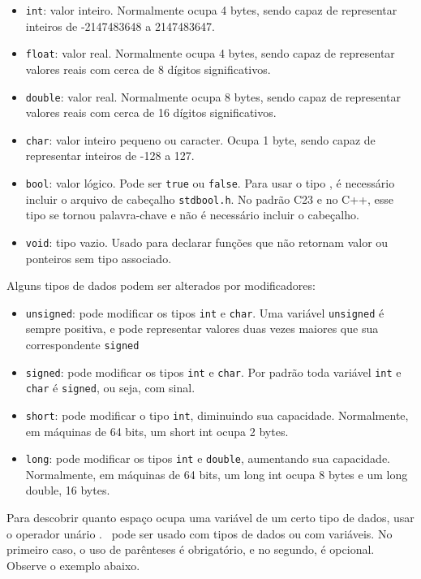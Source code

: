 \begin{itemize}
\item {\tt int}: valor inteiro. Normalmente ocupa 4 bytes, sendo capaz de representar inteiros de -2147483648 a 2147483647.
\item {\tt float}: valor real. Normalmente ocupa 4 bytes, sendo capaz de representar valores reais com cerca de 8 dígitos significativos.
\item {\tt double}: valor real. Normalmente ocupa 8 bytes, sendo capaz de representar valores reais com cerca de 16 dígitos significativos.
\item {\tt char}: valor inteiro pequeno ou caracter. Ocupa 1 byte, sendo capaz de representar inteiros de -128 a 127.
\item {\tt bool}: valor lógico. Pode ser {\tt true} ou {\tt false}. Para usar o tipo \BOOL, é necessário incluir o arquivo de cabeçalho {\tt stdbool.h}. No padrão C23 e no C++, esse tipo se tornou palavra-chave e não é necessário incluir o cabeçalho.

\item {\tt void}: tipo vazio. Usado para declarar funções que não retornam valor ou ponteiros sem tipo associado.
\end{itemize}

Alguns tipos de dados podem ser alterados por modificadores:

\begin{itemize}
\item {\tt unsigned}: pode modificar os tipos {\tt int} e {\tt char}. Uma variável {\tt unsigned} é sempre positiva, e pode representar valores duas vezes maiores que sua correspondente {\tt signed}
\item {\tt signed}: pode modificar os tipos {\tt int} e {\tt char}. 
Por padrão toda variável {\tt int} e {\tt char} é {\tt signed}, ou seja, com sinal.
\item {\tt short}: pode modificar o tipo {\tt int}, diminuindo sua capacidade. Normalmente, em máquinas de 64 bits, um short int ocupa 2 bytes.
\item {\tt long}: pode modificar os tipos {\tt int} e {\tt double}, aumentando sua capacidade. Normalmente, em máquinas de 64 bits, um long int ocupa 8 bytes e um long double, 16 bytes.

\end{itemize}

Para descobrir quanto espaço ocupa uma variável de um certo tipo de dados, usar o operador unário \SIZEOF. \SIZEOF\ pode ser usado com tipos de dados ou com variáveis. No primeiro caso, o uso de parênteses é obrigatório, e no segundo, é opcional. Observe o exemplo abaixo.

